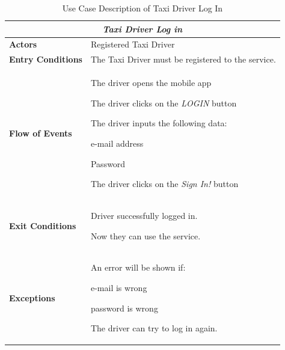 \documentclass[a4paper]{article}
\begin{document}
\begin{enumerate}[label=\bfseries G\arabic*:]
\begin{table} [H]
\begin{center}
\begin{tabular}{ |m{}|m{}|  }
\hline
    \multicolumn{2}{|c|}{\textbf{\textit{Taxi Driver Log in}}} \\
\hline \hline
    \textbf{Actors}
&   Registered Taxi Driver
\\ \hline
    \textbf{Entry Conditions}
&   The Taxi Driver must be registered to the service.
\\ \hline
    \textbf{Flow of Events}
& 
    \begin{enumerate*}
    \item The driver opens the mobile app
    \item The driver clicks on the \emph{LOGIN} button
    \item The driver inputs the following data:
        \begin{enumerate*}
        \item e-mail address
        \item Password
        \end{enumerate*}
    \item The driver clicks on the \emph{Sign In!} button
    \end{enumerate*}
\\ \hline
    \textbf{Exit Conditions}
&   Driver successfully logged in.

    Now they can use the service.
\\ \hline
    \textbf{Exceptions}
&   
    An error will be shown if:
    \begin{itemize*}
    \item e-mail is wrong
    \item password is wrong
    \end{itemize*}
    The driver can try to log in again.
\\ \hline
\end{tabular}
\end{center}
\caption{Use Case Description of Taxi Driver Log In}
\label{table:taxilogin}
\end{table}


\end{enumerate}
\end{document}
